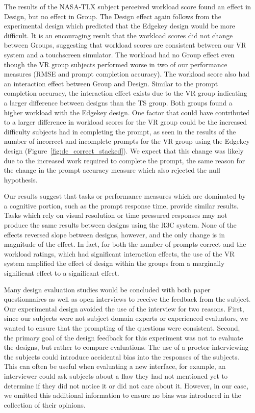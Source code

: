 The results of the NASA-TLX subject perceived workload score found an effect in Design, but no effect in Group.
The Design effect again follows from the experimental design which predicted that the Edgekey design would be more difficult.
It is an encouraging result that the workload scores did not change between Groups, suggesting that workload scores are consistent between our VR system and a touchscreen simulator.
The workload had no Group effect even though the VR group subjects performed worse in two of our performance measures (RMSE and prompt completion accuracy).
The workload score also had an interaction effect between Group and Design.
Similar to the prompt completion accuracy, the interaction effect exists due to the VR group indicating a larger difference between designs than the TS group.
Both groups found a higher workload with the Edgekey design.
One factor that could have contributed to a larger difference in workload scores for the VR group could be the increased difficulty subjects had in completing the prompt, as seen in the results of the number of incorrect and incomplete prompts for the VR group using the Edgekey design (Figure~\ref{fig:de_correct_stacked}).
We expect that this change was likely due to the increased work required to complete the prompt, the same reason for the change in the prompt accuracy measure which also rejected the null hypothesis.


Our results suggest that tasks or performance measures which are dominated by a cognitive portion, such as the prompt response time, provide similar results.
Tasks which rely on visual resolution or time pressured responses may not produce the same results between designs using the R3C system.
None of the effects reversed slope between designs, however, and the only change is in magnitude of the effect.
In fact, for both the number of prompts correct and the workload ratings, which had significant interaction effects, the use of the VR system amplified the effect of design within the groups from a marginally significant effect to a significant effect.

Many design evaluation studies would be concluded with both paper questionnaires as well as open interviews to receive the feedback from the subject.
Our experimental design avoided the use of the interview for two reasons.
First, since our subjects were not subject domain experts or experienced evaluators, we wanted to ensure that the prompting of the questions were consistent.
Second, the primary goal of the design feedback for this experiment was not to evaluate the designs, but rather to compare evaluations.
The use of a proctor interviewing the subjects could introduce accidental bias into the responses of the subjects.
This can often be useful when evaluating a new interface, for example, an interviewer could ask subjects about a flaw they had not mentioned yet to determine if they did not notice it or did not care about it.
However, in our case, we omitted this additional information to ensure no bias was introduced in the collection of their opinions.

